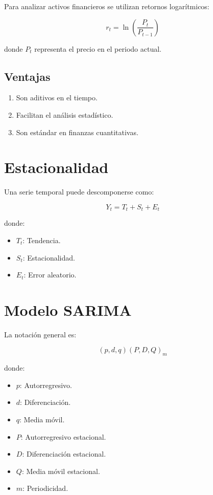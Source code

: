\documentclass[12pt]{article}
\begin{document}
Para analizar activos financieros se utilizan retornos logarítmicos:

\begin{equation}
r_t=\ln\left(\frac{P_t}{P_{t-1}}\right)
\end{equation}

donde $P_t$ representa el precio en el periodo actual.

\subsection{Ventajas}

\begin{enumerate}
    \item Son aditivos en el tiempo.
    \item Facilitan el análisis estadístico.
    \item Son estándar en finanzas cuantitativas.
\end{enumerate}

\section{Estacionalidad}

Una serie temporal puede descomponerse como:

\begin{equation}
Y_t = T_t + S_t + E_t
\end{equation}

donde:

\begin{itemize}
    \item $T_t$: Tendencia.
    \item $S_t$: Estacionalidad.
    \item $E_t$: Error aleatorio.
\end{itemize}

\section{Modelo SARIMA}

La notación general es:

\begin{equation}
(p,d,q)(P,D,Q)_m
\end{equation}

donde:

\begin{itemize}
    \item $p$: Autorregresivo.
    \item $d$: Diferenciación.
    \item $q$: Media móvil.
    \item $P$: Autorregresivo estacional.
    \item $D$: Diferenciación estacional.
    \item $Q$: Media móvil estacional.
    \item $m$: Periodicidad.
\end{itemize}
\end{document}
